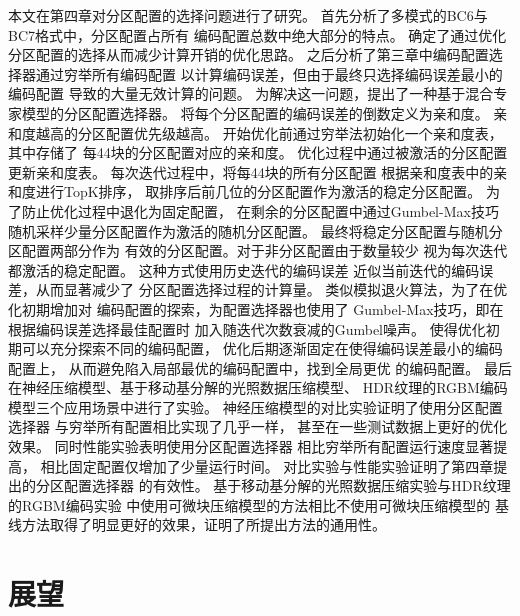 本文在第四章对分区配置的选择问题进行了研究。
首先分析了多模式的BC6与BC7格式中，分区配置占所有
编码配置总数中绝大部分的特点。
确定了通过优化分区配置的选择从而减少计算开销的优化思路。
之后分析了第三章中编码配置选择器通过穷举所有编码配置
以计算编码误差，但由于最终只选择编码误差最小的编码配置
导致的大量无效计算的问题。
为解决这一问题，提出了一种基于混合专家模型的分区配置选择器。
将每个分区配置的编码误差的倒数定义为亲和度。
亲和度越高的分区配置优先级越高。
开始优化前通过穷举法初始化一个亲和度表，其中存储了
每4\times4块的分区配置对应的亲和度。
优化过程中通过被激活的分区配置更新亲和度表。
每次迭代过程中，将每4\times4块的所有分区配置
根据亲和度表中的亲和度进行TopK排序，
取排序后前几位的分区配置作为激活的稳定分区配置。
为了防止优化过程中退化为固定配置，
在剩余的分区配置中通过Gumbel-Max技巧
随机采样少量分区配置作为激活的随机分区配置。
最终将稳定分区配置与随机分区配置两部分作为
有效的分区配置。对于非分区配置由于数量较少
视为每次迭代都激活的稳定配置。
这种方式使用历史迭代的编码误差
近似当前迭代的编码误差，从而显著减少了
分区配置选择过程的计算量。
类似模拟退火算法，为了在优化初期增加对
编码配置的探索，为配置选择器也使用了
Gumbel-Max技巧，即在根据编码误差选择最佳配置时
加入随迭代次数衰减的Gumbel噪声。
使得优化初期可以充分探索不同的编码配置，
优化后期逐渐固定在使得编码误差最小的编码配置上，
从而避免陷入局部最优的编码配置中，找到全局更优
的编码配置。
最后在神经压缩模型、基于移动基分解的光照数据压缩模型、
HDR纹理的RGBM编码模型三个应用场景中进行了实验。
神经压缩模型的对比实验证明了使用分区配置选择器
与穷举所有配置相比实现了几乎一样，
甚至在一些测试数据上更好的优化效果。
同时性能实验表明使用分区配置选择器
相比穷举所有配置运行速度显著提高，
相比固定配置仅增加了少量运行时间。
对比实验与性能实验证明了第四章提出的分区配置选择器
的有效性。
基于移动基分解的光照数据压缩实验与HDR纹理的RGBM编码实验
中使用可微块压缩模型的方法相比不使用可微块压缩模型的
基线方法取得了明显更好的效果，证明了所提出方法的通用性。

\section{展望}

